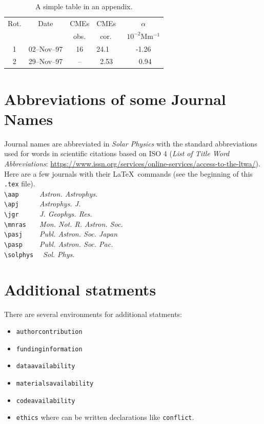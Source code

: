 \documentclass[namedreferences,hyperref,optionalrh]{spr-sola}
\newcommand{\aap}{{\it Astron. Astrophys.}}
\newcommand{\apj}{{\it Astrophys. J.}}
\newcommand{\jgr}{{\it J. Geophys. Res.}}
\newcommand{\mnras}{{\it Mon. Not. R. Astron. Soc.}}
\newcommand{\pasp}{{\it Publ. Astron. Soc. Pac.}}
\newcommand{\pasj}{{\it Publ. Astron. Soc. Japan}}
\newcommand{\solphys}{{\it Sol. Phys.}}
\begin{document}
\begin{table}
\caption{ A simple table in an appendix. }
\label{T-appendix}
\begin{tabular}{ccclc}     %
  \hline                   %
Rot. & Date & CMEs & CMEs~ & $\alpha$ \\
     &      & obs. & ~cor. & $10^{-2}$Mm$^{-1}$\\
  \hline
1 & 02--Nov--97 & 16  & 24.1  & -1.26 \\
2 & 29--Nov--97 & --  & ~2.53 & ~0.94 \\
  \hline
\end{tabular}
\end{table}


\section{Abbreviations of some Journal Names} %
\label{S-appendix}
Journal names are abbreviated in {\it Solar Physics} 
with the standard abbreviations used for words in scientific citations based on ISO 4 
({\it List of Title Word Abbreviations}: \url{ https://www.issn.org/services/online-services/access-to-the-ltwa/}). 
Here are a few journals with their \LaTeX\ commands (see the beginning of this \texttt{.tex} file).\\
  \verb+\aap     + \aap \\
  \verb+\apj     + \apj \\
  \verb+\jgr     + \jgr \\
  \verb+\mnras   + \mnras \\
  \verb+\pasj    + \pasj \\
  \verb+\pasp    + \pasp \\
  \verb+\solphys +~ \solphys 


\section{Additional statments}

There are several environments for additional statments: 
\begin{itemize}
\item \texttt{authorcontribution}
\item \texttt{fundinginformation}
\item \texttt{dataavailability}
\item \texttt{materialsavailability}
\item \texttt{codeavailability}
\item \texttt{ethics} where can be written declarations like \texttt{conflict}.
\end{itemize}
 
\end{document}
